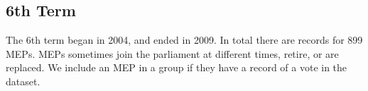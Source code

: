 \documentclass{llncs}
\begin{document}


\subsection{6th Term}

The 6th term began in 2004, and ended in 2009. In total there are records for 899 MEPs. MEPs sometimes join the parliament at different times, retire, or are replaced. We include an MEP in a group if they have a record of a vote in the dataset.



\noindent%
\begin{minipage}{\linewidth}%
\label{fig:allmethods6}
\end{minipage}
\end{document}

